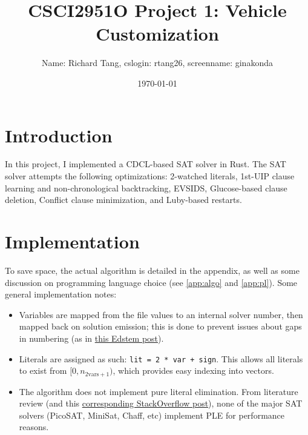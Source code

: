 \documentclass[11pt]{article}
\title{CSCI2951O Project 1: Vehicle Customization}
\author{Name: Richard Tang, cslogin: rtang26, screenname: ginakonda}
\date{\today}
\begin{document}
\maketitle

\section{Introduction}
In this project, I implemented a CDCL-based SAT solver in Rust. The SAT solver attempts the
following optimizations: 2-watched literals, 1st-UIP clause learning and non-chronological
backtracking, EVSIDS, Glucose-based clause deletion, Conflict clause minimization, and Luby-based
restarts.

\section{Implementation}

To save space, the actual algorithm is detailed in the appendix, as well as some discussion on
programming language choice (see \ref{app:algo} and \ref{app:pl}). Some general implementation
notes:
\begin{itemize}
    \item Variables are mapped from the file values to an internal solver number, then mapped back
        on solution emission; this is done to prevent issues about gaps in numbering (as in
        \href{https://edstem.org/us/courses/55070/discussion/4403836}{this Edstem post}).
    \item Literals are assigned as such: \texttt{lit = 2 * var + sign}. This allows all literals to
        exist from $[0, n_{2\text{vars}+1})$, which provides easy indexing into vectors.
    \item The algorithm does not implement pure literal elimination. From literature review (and
        this \href{https://cs.stackexchange.com/q/44924}{corresponding StackOverflow post}), none of
        the major SAT solvers (PicoSAT, MiniSat, Chaff, etc) implement PLE for performance reasons.
\end{itemize}
\end{document}
